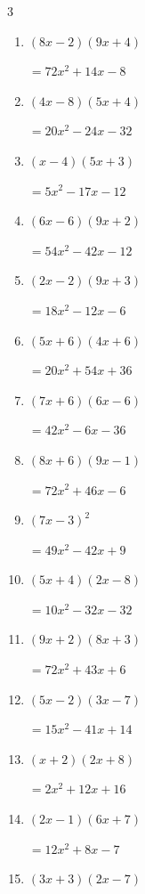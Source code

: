 \begin{multicols}{3}
\begin{enumerate}
        $=45x^{2}+49x-6$

\columnbreak %

  \item $(8x-2)(9x+4)$

        $=72x^{2}+14x-8$

  \item $(4x-8)(5x+4)$

        $=20x^{2}-24x-32$

  \item $(x-4)(5x+3)$

        $=5x^{2}-17x-12$

  \item $(6x-6)(9x+2)$

        $=54x^{2}-42x-12$

  \item $(2x-2)(9x+3)$

        $=18x^{2}-12x-6$

  \item $(5x+6)(4x+6)$

        $=20x^{2}+54x+36$

  \item $(7x+6)(6x-6)$

        $=42x^{2}-6x-36$

  \item $(8x+6)(9x-1)$

        $=72x^{2}+46x-6$

  \item $(7x-3)^{2}$

        $=49x^{2}-42x+9$

  \item $(5x+4)(2x-8)$

        $=10x^{2}-32x-32$

  \item $(9x+2)(8x+3)$

        $=72x^{2}+43x+6$

  \item $(5x-2)(3x-7)$

        $=15x^{2}-41x+14$

  \item $(x+2)(2x+8)$

        $=2x^{2}+12x+16$

  \item $(2x-1)(6x+7)$

        $=12x^{2}+8x-7$

  \item $(3x+3)(2x-7)$


\end{enumerate}
\end{multicols}
